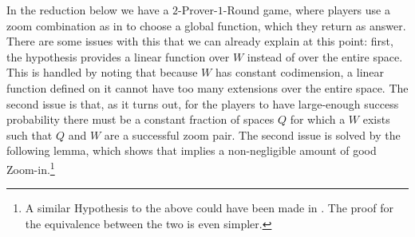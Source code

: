 \documentclass{toc}
\begin{document}
%

In the reduction below we have a $2$-Prover-$1$-Round game, where
players use a zoom combination as in  to
choose a global function, which they return as answer. There are some
issues with this that we can already explain at this point: first, the
hypothesis provides a linear function over $W$ instead of over the entire
space. This is handled by noting that because $W$ has constant
codimension, a linear function defined on it cannot have too many
extensions over the entire space. The second issue is that, as it
turns out, for the players to have large-enough success probability
there must be a constant fraction of spaces $Q$ for which a $W$ exists
such that $Q$ and $W$ are a successful zoom pair. The second issue is
solved by the following lemma, which shows that
 implies a non-negligible amount of good
Zoom-in.\footnote{A similar Hypothesis
  to the above could have been made in \cite{KMS}. The proof for the
  equivalence between the two is even simpler.}
\end{document}
